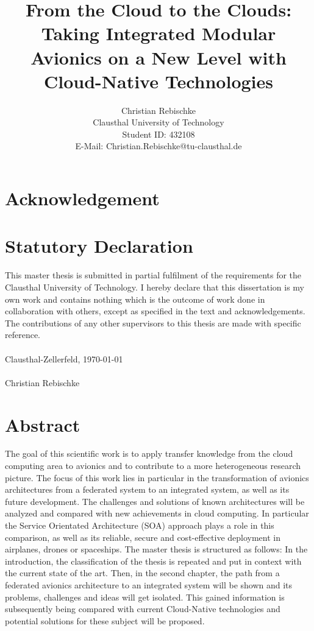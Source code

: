 \documentclass[titlepage]{report}
\title{From the Cloud to the Clouds: Taking Integrated Modular Avionics on a New Level with Cloud-Native Technologies}
\author{Christian Rebischke\\
Clausthal University of Technology\\
Student ID: 432108 \\
E-Mail: Christian.Rebischke@tu-clausthal.de}
\begin{document}
\maketitle
\chapter*{Acknowledgement}
\chapter*{Statutory Declaration}
This master thesis is submitted in partial fulfilment of the requirements for the Clausthal
University of Technology. I hereby declare that this dissertation is my own work and
contains nothing which is the outcome of work done in collaboration with others,
except as specified in the text and acknowledgements. The contributions of any other
supervisors to this thesis are made with specific reference.
\\
\\
Clausthal-Zellerfeld, \today
\\
\\
Christian Rebischke
\chapter*{Abstract}
The goal of this scientific work is to apply transfer knowledge from the cloud computing area to avionics and to
contribute to a more heterogeneous research picture. The focus of this work lies in particular in the transformation
of avionics architectures from a federated system to an integrated system, as well as its future development.
The challenges and solutions of known architectures will be analyzed and compared with new
achievements in cloud computing. In particular
the Service Orientated Architecture (SOA) approach plays a role in this comparison, as well as its
reliable, secure and cost-effective deployment in airplanes, drones or spaceships.
The master thesis is structured as follows: In the introduction, the classification of the thesis is repeated
and put in context with the current state of the art. Then, in the second chapter, the path from a federated
avionics architecture to an integrated system will be shown and its problems, challenges
and ideas will get isolated. This gained information is subsequently being compared with current Cloud-Native technologies
and potential solutions for these subject will be proposed.
\end{document}
